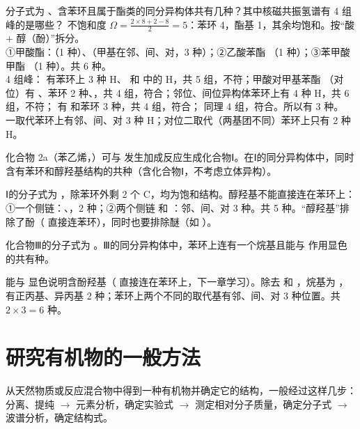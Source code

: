 \begin{liti}[综合]
分子式为 、含苯环且属于酯类的同分异构体共有几种？其中核磁共振氢谱有 4 组峰的是哪些？
\tcblower
\silu 不饱和度 $\Omega=\frac{2\times8+2-8}{2}=5$：苯环 4，酯基 1，其余均饱和。按“酸 $+$ 醇（酚）”拆分。\\
\jie ①甲酸酯：（1 种）、（甲基在邻、间、对，3 种）；②乙酸苯酯 （1 种）；③苯甲酸甲酯 （1 种）。共 6 种。\\
4 组峰： 有苯环上 3 种 H、 和  中的 H，共 5 组，不符；甲酸对甲基苯酯 （对位）有 、苯环 2 种、，共 4 组，符合；邻位、间位异构体苯环上有 4 种 H，共 6 组，不符； 有  和苯环 3 种，共 4 组，符合； 同理 4 组，符合。所以有 3 种。\\
\xianjing 一取代苯环上有邻、间、对 3 种 H；对位二取代（两基团不同）苯环上只有 2 种 H。
\end{liti}

\begin{liti}
化合物 2a（苯乙烯，）可与  发生加成反应生成化合物Ⅰ。在Ⅰ的同分异构体中，同时含有苯环和醇羟基结构的共\tk{}种（含化合物Ⅰ，不考虑立体异构）。

\tcblower
\jieⅠ的分子式为 ，除苯环外剩 2 个 C，均为饱和结构。醇羟基不能直接连在苯环上：①一个侧链：、，2 种；②两个侧链  和 ：邻、间、对 3 种。共 5 种。“醇羟基”排除了酚（ 直接连苯环），同时也要排除醚（如 ）。
\end{liti}

\begin{liti}[据2026年广东卷第20题(3)改编]
化合物Ⅲ的分子式为 。Ⅲ的同分异构体中，苯环上连有一个烷基且能与  作用显色的共有\tk{}种。

\tcblower
\jie 能与  显色说明含酚羟基（ 直接连在苯环上，下一章学习）。除去  和 ，烷基为 ，有正丙基、异丙基 2 种；苯环上两个不同的取代基有邻、间、对 3 种位置。共 $2\times3=6$ 种。
\end{liti}

\section{研究有机物的一般方法}
从天然物质或反应混合物中得到一种有机物并确定它的结构，一般经过这样几步：分离、提纯 $\to$ 元素分析，确定实验式 $\to$ 测定相对分子质量，确定分子式 $\to$ 波谱分析，确定结构式。

